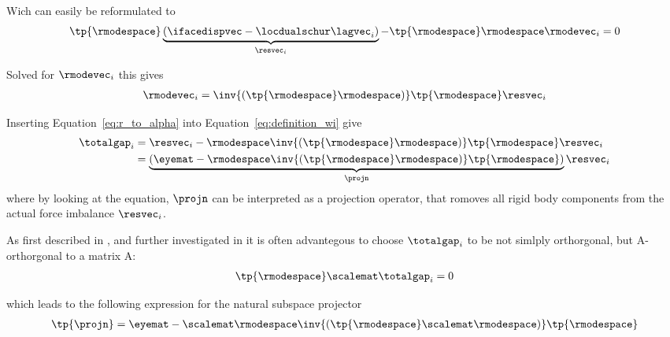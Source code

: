 \documentclass[preview]{standalone} %
\begin{document}
Wich can easily be reformulated to
\begin{align}
\tp{\rmodespace} \underbrace{(\ifacedispvec- \locdualschur \lagvec_i)}_{\resvec_i} - \tp{\rmodespace} \rmodespace \rmodevec_i =0
\end{align}

Solved for $\rmodevec_i$ this gives
\begin{align}
\rmodevec_i=\inv{(\tp{\rmodespace}\rmodespace)}\tp{\rmodespace}\resvec_i
\label{eq:r_to_alpha}
\end{align}

Inserting Equation~\eqref{eq:r_to_alpha} into Equation~\eqref{eq:definition_wi} give
\begin{align}
\totalgap_i&=\resvec_i-\rmodespace \inv{(\tp{\rmodespace}\rmodespace)}\tp{\rmodespace}\resvec_i\\
       &=\underbrace{(\eyemat-\rmodespace \inv{(\tp{\rmodespace}\rmodespace)}\tp{\rmodespace})}_{\projn}\resvec_i
\end{align}
where by looking at the equation, $\projn$ can be interpreted as a projection operator, that romoves all rigid body components from the actual force imbalance $\resvec_i$.

As first described in \cite{FarhatRoux1994}, and further investigated in \cite{RixenPHD} it is often advantegous to choose $\totalgap_i$ to be not simlply orthorgonal, but A-orthorgonal to a matrix A:
\begin{align}
\tp{\rmodespace} \scalemat \totalgap_i =0
\end{align}

which leads to the following expression for the natural subspace projector
\begin{align}
\tp{\projn}=\eyemat-\scalemat\rmodespace \inv{(\tp{\rmodespace}\scalemat\rmodespace)}\tp{\rmodespace}
\end{align}
\end{document}
